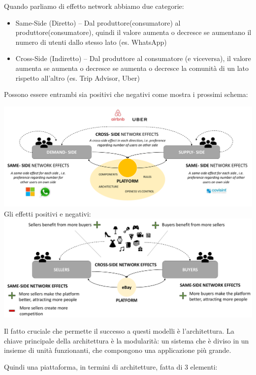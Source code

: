 \documentclass[a4page, 11pt]{article}
\begin{document}
Quando parliamo di effetto network abbiamo due categorie:

\begin{itemize}
	 
	\item
	Same-Side (Diretto) -- Dal produttore(consumatore) al
	produttore(consumatore), quindi il valore aumenta o decresce se
	aumentano il numero di utenti dallo stesso lato (es. WhatsApp)
	\item
	Cross-Side (Indiretto) -- Dal produttore al consumatore (e viceversa),
	il valore aumenta se aumenta o decresce se aumenta o decresce la
	comunità di un lato rispetto all'altro (es. Trip Advisor, Uber)
\end{itemize}

Possono essere entrambi sia positivi che negativi come mostra i prossimi
schema:

\includegraphics[scale=0.35]{image5.png} \newline
Gli effetti positivi e negativi: \newline
\includegraphics[scale=0.35]{image6.png}


Il fatto cruciale che permette il successo a questi modelli è
l'architettura. La chiave principale della architettura è la modularità:
un sistema che è diviso in un insieme di unità funzionanti, che
compongono una applicazione più grande.

Quindi una piattaforma, in termini di architetture, fatta di 3 elementi:
\end{document}
